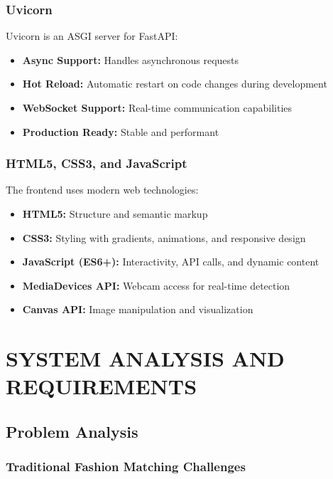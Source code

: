 \documentclass[12pt,a4paper]{report}
\begin{document}
\subsection{Uvicorn}

Uvicorn is an ASGI server for FastAPI:

\begin{itemize}
    \item \textbf{Async Support:} Handles asynchronous requests
    \item \textbf{Hot Reload:} Automatic restart on code changes during development
    \item \textbf{WebSocket Support:} Real-time communication capabilities
    \item \textbf{Production Ready:} Stable and performant
\end{itemize}

\subsection{HTML5, CSS3, and JavaScript}

The frontend uses modern web technologies:

\begin{itemize}
    \item \textbf{HTML5:} Structure and semantic markup
    \item \textbf{CSS3:} Styling with gradients, animations, and responsive design
    \item \textbf{JavaScript (ES6+):} Interactivity, API calls, and dynamic content
    \item \textbf{MediaDevices API:} Webcam access for real-time detection
    \item \textbf{Canvas API:} Image manipulation and visualization
\end{itemize}

\chapter{SYSTEM ANALYSIS AND REQUIREMENTS}

\section{Problem Analysis}

\subsection{Traditional Fashion Matching Challenges}
\end{document}
